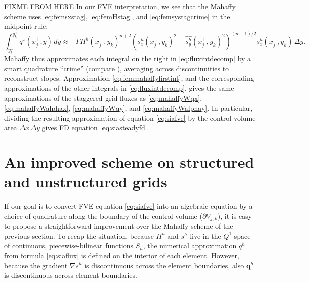 \documentclass[twocolumn,letterpaper]{igs}
\newcommand\bq{\mathbf{q}}
\newcommand{\grad}{\nabla}
\begin{document}
FIXME FROM HERE  In our FVE interpretation, we see that the Mahaffy scheme uses \eqref{eq:femsxstag}, \eqref{eq:femHstag}, and \eqref{eq:femsystagcrime} in the midpoint rule:
\begin{equation}
\int_{y_k^-}^{y_k^+} q^x(x_j^+,y)\,dy \approx - \Gamma H^h(x_j^+,y_k)^{n+2} \left(s^h_x(x_j^+,y_k)^2 + \widehat{s^h_y}(x_j^+,y_k)^2\right)^{(n-1)/2} s^h_x(x_j^+,y_k)\,\Delta y. \label{eq:femmahaffyfirstint}
\end{equation}
Mahaffy thus approximates each integral on the right in \eqref{eq:fluxintdecomp} by a smart quadrature ``crime'' (compare \cite{Strang1972}), averaging across discontinuities to reconstruct slopes.  Approximation \eqref{eq:femmahaffyfirstint}, and the corresponding approximations of the other integrals in \eqref{eq:fluxintdecomp}, gives the same approximations of the staggered-grid fluxes as \eqref{eq:mahaffyWqx}, \eqref{eq:mahaffyWalphax}, \eqref{eq:mahaffyWqy}, and \eqref{eq:mahaffyWalphay}.  In particular, dividing the resulting approximation of equation \eqref{eq:siafve} by the control volume area $\Delta x\,\Delta y$ gives FD equation \eqref{eq:siasteadyfd}.

\section{An improved scheme on structured and unstructured grids}  \label{sec:star}

If our goal is to convert FVE equation \eqref{eq:siafve} into an algebraic equation by a choice of quadrature along the boundary of the control volume ($\partial V_{j,k}$), it is easy to propose a straightforward improvement over the Mahaffy scheme of the previous section.  To recap the situation, because $H^h$ and $s^h$ live in the $Q^1$ space of continuous, piecewise-bilinear functions $S_h$, the numerical approximation $q^h$ from formula \eqref{eq:siaflux} is defined on the interior of each element.  However, because the gradient $\grad s^h$ is discontinuous across the element boundaries, also $\bq^h$ is discontinuous across element boundaries.
\end{document}
